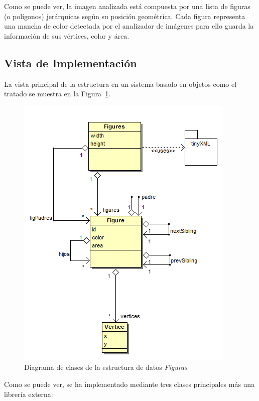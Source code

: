 	Como se puede ver, la imagen analizada está compuesta por una lista de figuras (o polígonos) jerárquicas según su posición geométrica. Cada figura representa una mancha de color detectada por el analizador de imágenes para ello guarda la información de sus vértices, color y área.


\subsection{Vista de Implementación}

	La vista principal de la estructura en un sistema basado en objetos como el tratado se muestra en la Figura~\ref{fig:diagramaClasesFigure}.\\

		\begin{figure}[htbp]
		\centering
		\includegraphics[scale=0.60]{graphics/diagramaClasesFigure.png}
		\caption{Diagrama de clases de la estructura de datos \emph{Figuras}}
		\label{fig:diagramaClasesFigure}
		\end{figure}
		
	Como se puede ver, se ha implementado mediante tres clases principales más una librería externa:
	
